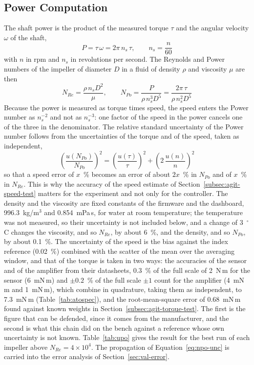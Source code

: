 \subsection{Power Computation}
\label{subsec:agit-power}

The shaft power is the product of the measured torque $\tau$ and the angular velocity $\omega$ of the shaft,
\begin{equation}
    P = \tau\,\omega = 2\pi\, n_s\, \tau, \qquad n_s = \frac{n}{60}
    \label{eq:shaftpower}
\end{equation}
with $n$ in rpm and $n_s$ in revolutions per second. The Reynolds and Power numbers of the impeller of diameter $D$ in a fluid of density $\rho$ and viscosity $\mu$ are then
\begin{equation}
    N_{Re} = \frac{\rho\, n_s D^{2}}{\mu}, \qquad
    N_{Po} = \frac{P}{\rho\, n_s^{3} D^{5}} = \frac{2\pi\,\tau}{\rho\, n_s^{2} D^{5}}
    \label{eq:npo-torque}
\end{equation}
Because the power is measured as torque times speed, the speed enters the Power number as $n_s^{-2}$ and not as $n_s^{-3}$: one factor of the speed in the power cancels one of the three in the denominator. The relative standard uncertainty of the Power number follows from the uncertainties of the torque and of the speed, taken as independent,
\begin{equation}
    \left(\frac{u(N_{Po})}{N_{Po}}\right)^{2} = \left(\frac{u(\tau)}{\tau}\right)^{2} + \left(2\,\frac{u(n)}{n}\right)^{2}
    \label{eq:npo-unc}
\end{equation}
so that a speed error of $x$~\% becomes an error of about $2x$~\% in $N_{Po}$ and of $x$~\% in $N_{Re}$. This is why the accuracy of the speed estimate of Section~\ref{subsec:agit-speed-test} matters for the experiment and not only for the controller. The density and the viscosity are fixed constants of the firmware and the dashboard, 996.3~kg/m$^3$ and 0.854~mPa\,s, for water at room temperature; the temperature was not measured, so their uncertainty is not included below, and a change of 3~$^{\circ}$C changes the viscosity, and so $N_{Re}$, by about 6~\%, and the density, and so $N_{Po}$, by about 0.1~\%. The uncertainty of the speed is the bias against the index reference (0.02~\%) combined with the scatter of the mean over the averaging window, and that of the torque is taken in two ways: the accuracies of the sensor and of the amplifier from their datasheets, 0.3~\% of the full scale of 2~N\,m for the sensor (6~mN\,m) and $\pm0.2$~\% of the full scale $\pm1$ count for the amplifier (4~mN\,m and 1~mN\,m), which combine in quadrature, taking them as independent, to 7.3~mN\,m (Table~\ref{tab:atospec}), and the root-mean-square error of 0.68~mN\,m found against known weights in Section~\ref{subsec:agit-torque-test}. The first is the figure that can be defended, since it comes from the manufacturer, and the second is what this chain did on the bench against a reference whose own uncertainty is not known. Table~\ref{tab:upo} gives the result for the best run of each impeller above $N_{Re} = 4\times10^{4}$. The propagation of Equation~\ref{eq:npo-unc} is carried into the error analysis of Section~\ref{sec:val-error}.

